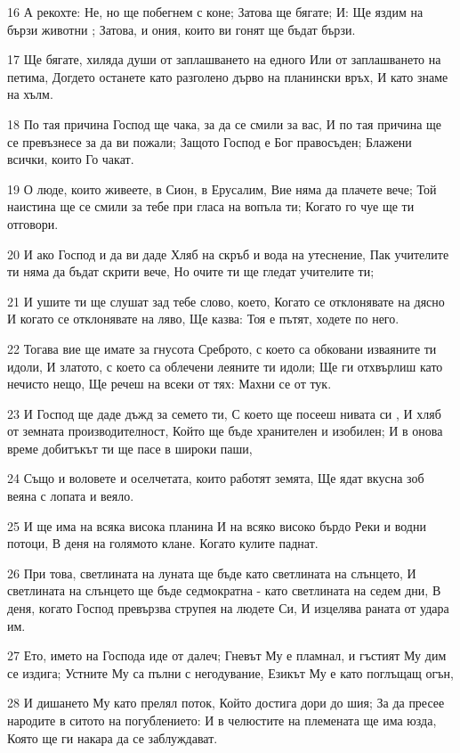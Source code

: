 \par 16 А рекохте: Не, но ще побегнем с коне; Затова ще бягате; И: Ще яздим на бързи животни ; Затова, и ония, които ви гонят ще бъдат бързи.
\par 17 Ще бягате, хиляда души от заплашването на едного Или от заплашването на петима, Догдето останете като разголено дърво на планински връх, И като знаме на хълм.
\par 18 По тая причина Господ ще чака, за да се смили за вас, И по тая причина ще се превъзнесе за да ви пожали; Защото Господ е Бог правосъден; Блажени всички, които Го чакат.
\par 19 О люде, които живеете, в Сион, в Ерусалим, Вие няма да плачете вече; Той наистина ще се смили за тебе при гласа на вопъла ти; Когато го чуе ще ти отговори.
\par 20 И ако Господ и да ви даде Хляб на скръб и вода на утеснение, Пак учителите ти няма да бъдат скрити вече, Но очите ти ще гледат учителите ти;
\par 21 И ушите ти ще слушат зад тебе слово, което, Когато се отклонявате на дясно И когато се отклонявате на ляво, Ще казва: Тоя е пътят, ходете по него.
\par 22 Тогава вие ще имате за гнусота Среброто, с което са обковани изваяните ти идоли, И златото, с което са облечени леяните ти идоли; Ще ги отхвърлиш като нечисто нещо, Ще речеш на всеки от тях: Махни се от тук.
\par 23 И Господ ще даде дъжд за семето ти, С което ще посееш нивата си , И хляб от земната производителност, Който ще бъде хранителен и изобилен; И в онова време добитъкът ти ще пасе в широки паши,
\par 24 Също и воловете и оселчетата, които работят земята, Ще ядат вкусна зоб веяна с лопата и веяло.
\par 25 И ще има на всяка висока планина И на всяко високо бърдо Реки и водни потоци, В деня на голямото клане. Когато кулите паднат.
\par 26 При това, светлината на луната ще бъде като светлината на слънцето, И светлината на слънцето ще бъде седмократна - като светлината на седем дни, В деня, когато Господ превързва струпея на людете Си, И изцелява раната от удара им.
\par 27 Ето, името на Господа иде от далеч; Гневът Му е пламнал, и гъстият Му дим се издига; Устните Му са пълни с негодувание, Езикът Му е като поглъщащ огън,
\par 28 И дишането Му като прелял поток, Който достига дори до шия; За да пресее народите в ситото на погублението: И в челюстите на племената ще има юзда, Която ще ги накара да се заблуждават.
